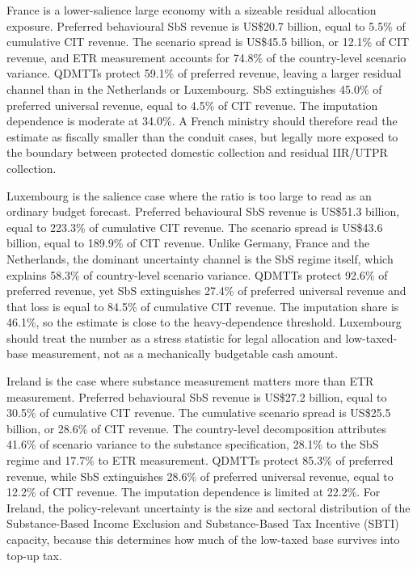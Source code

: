 \documentclass[11pt,a4paper]{article}
\begin{document}
France is a lower-salience large economy with a sizeable residual allocation exposure. Preferred behavioural SbS revenue is US\$20.7 billion, equal to 5.5\% of cumulative CIT revenue. The scenario spread is US\$45.5 billion, or 12.1\% of CIT revenue, and ETR measurement accounts for 74.8\% of the country-level scenario variance. QDMTTs protect 59.1\% of preferred revenue, leaving a larger residual channel than in the Netherlands or Luxembourg. SbS extinguishes 45.0\% of preferred universal revenue, equal to 4.5\% of CIT revenue. The imputation dependence is moderate at 34.0\%. A French ministry should therefore read the estimate as fiscally smaller than the conduit cases, but legally more exposed to the boundary between protected domestic collection and residual IIR/UTPR collection.

Luxembourg is the salience case where the ratio is too large to read as an ordinary budget forecast. Preferred behavioural SbS revenue is US\$51.3 billion, equal to 223.3\% of cumulative CIT revenue. The scenario spread is US\$43.6 billion, equal to 189.9\% of CIT revenue. Unlike Germany, France and the Netherlands, the dominant uncertainty channel is the SbS regime itself, which explains 58.3\% of country-level scenario variance. QDMTTs protect 92.6\% of preferred revenue, yet SbS extinguishes 27.4\% of preferred universal revenue and that loss is equal to 84.5\% of cumulative CIT revenue. The imputation share is 46.1\%, so the estimate is close to the heavy-dependence threshold. Luxembourg should treat the number as a stress statistic for legal allocation and low-taxed-base measurement, not as a mechanically budgetable cash amount.

Ireland is the case where substance measurement matters more than ETR measurement. Preferred behavioural SbS revenue is US\$27.2 billion, equal to 30.5\% of cumulative CIT revenue. The cumulative scenario spread is US\$25.5 billion, or 28.6\% of CIT revenue. The country-level decomposition attributes 41.6\% of scenario variance to the substance specification, 28.1\% to the SbS regime and 17.7\% to ETR measurement. QDMTTs protect 85.3\% of preferred revenue, while SbS extinguishes 28.6\% of preferred universal revenue, equal to 12.2\% of CIT revenue. The imputation dependence is limited at 22.2\%. For Ireland, the policy-relevant uncertainty is the size and sectoral distribution of the Substance-Based Income Exclusion and Substance-Based Tax Incentive (SBTI) capacity, because this determines how much of the low-taxed base survives into top-up tax.
\end{document}
